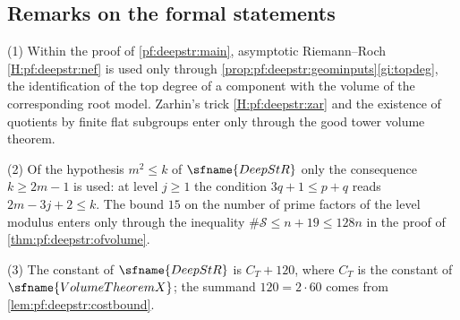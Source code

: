 \subsection{Remarks on the formal statements}\label{sec:pf:deepstr:remarks}

\begin{remark}\label{rem:pf:deepstr:hyps}
(1) Within the proof of \cref{pf:deepstr:main}, asymptotic Riemann--Roch \ref{H:pf:deepstr:nef} is used only
through \cref{prop:pf:deepstr:geominputs}\ref{gi:topdeg}, the identification of the top degree of a component
with the volume of the corresponding root model. Zarhin's trick \ref{H:pf:deepstr:zar} and the existence of
quotients by finite flat subgroups enter only through the good tower volume theorem.

(2) Of the hypothesis $m^2\le k$ of $\sfname{DeepStR}$ only the consequence $k\ge2m-1$ is used: at level $j\ge1$
the condition $3q+1\le p+q$ reads $2m-3j+2\le k$. The bound $15$ on the number of prime factors of the level
modulus enters only through the inequality $\#\mathcal S\le n+19\le128n$ in the proof of
\cref{thm:pf:deepstr:ofvolume}.

(3) The constant of $\sfname{DeepStR}$ is $C_T+120$, where $C_T$ is the constant of $\sfname{VolumeTheoremX}$;
the summand $120=2\cdot60$ comes from \cref{lem:pf:deepstr:costbound}.
\end{remark}

